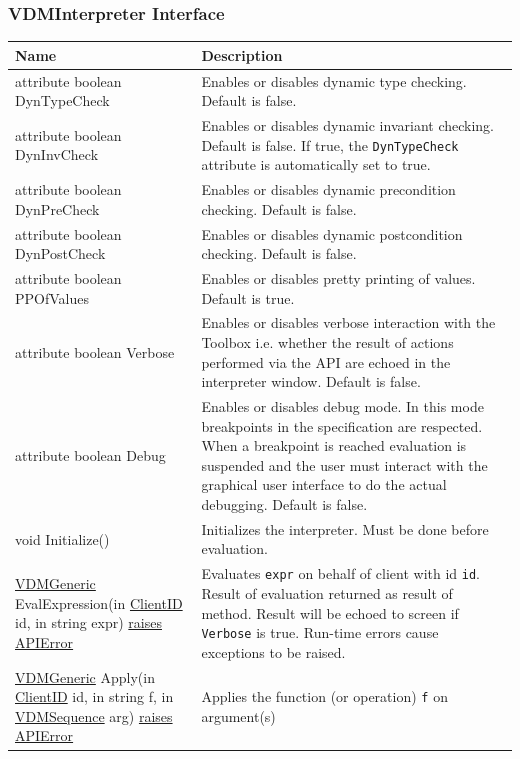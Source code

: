 \documentclass[\pformat,12pt]{article}
\newcommand{\pbs}[1]{\let\temp=\\#1\let\\=\temp}
\newenvironment{interfacetable}{%
  \begin{longtable}{|>{\pbs\raggedright\ttfamily}p{6.6cm}%
                    |>{\pbs\raggedright}p{6.6cm}|} \hline
  \textrm{\bfseries Name} &  \textbf{Description} \\ \hline
  \endhead
  }{\end{longtable}}
\newcommand{\APIError}{\hyperlink{exception.APIError}{raises APIError}}
\newcommand{\VDMGeneric}{\hyperlink{interface.Generic}{VDMGeneric}}
\newcommand{\ClientID}{\hyperlink{type.ClientID}{ClientID}}
\newcommand{\VDMSequence}{\hyperlink{interface.VDMSequence}{VDMSequence}}
\begin{document}
\subsubsection{VDMInterpreter Interface}
\mbox{}
\begin{interfacetable}

attribute boolean DynTypeCheck
  & Enables or disables dynamic type checking. Default is \textsf{false}.
\\ \hline
attribute boolean DynInvCheck
  & Enables or disables dynamic invariant checking. Default is
    \textsf{false}. If true, the \texttt{DynTypeCheck} attribute is
    automatically set to true.
\\ \hline
attribute boolean DynPreCheck
  & Enables or disables dynamic precondition checking. Default is
   \textsf{false}. 
\\ \hline
attribute boolean DynPostCheck
  & Enables or disables dynamic postcondition checking. Default is
    \textsf{false}. 
\\ \hline
attribute boolean PPOfValues
  & Enables or disables pretty printing of values. Default is
    \textsf{true}. 
\\ \hline
attribute boolean Verbose
  & Enables or disables verbose interaction with the Toolbox
    i.e. whether the result of actions performed via the API are
    echoed in the interpreter window. Default is \textsf{false}.
\\ \hline
attribute boolean Debug
  & Enables or disables debug mode. In this mode
    breakpoints in the specification are respected. When a breakpoint
    is reached evaluation is suspended and the user must interact with
    the graphical user interface to do the actual debugging. Default
    is \textsf{false}.
\\ \hline
void Initialize() %
  & Initializes the interpreter. Must be done before evaluation. 
\\ \hline
{\VDMGeneric} EvalExpression(in {\ClientID} id, in string expr) \APIError
  & Evaluates \texttt{expr} on behalf of client with id
    \texttt{id}. Result of evaluation returned as result of
    method. Result will be echoed to screen if \texttt{Verbose} is
    \textsf{true}. Run-time errors cause exceptions to be raised.
\\ \hline
{\VDMGeneric} Apply(in {\ClientID} id, in string f, in {\VDMSequence} arg)
\APIError
  & Applies the function (or operation) \texttt{f} on argument(s)

\end{interfacetable}
\end{document}
